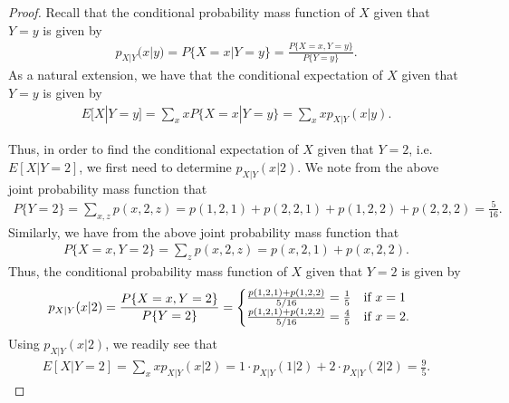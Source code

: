 \begin{proof}
  Recall that the conditional probability mass function of $X$ given that $Y = y$
  is given by
  \begin{align*}
    p_{X|Y}(x|y) = P\{X=x|Y=y\} = \frac{P\{X=x, Y=y\}}{P\{Y=y\}}.
  \end{align*}
  As a natural extension, we have that the conditional expectation of $X$ given
  that $Y=y$ is given by
  \begin{align*}
    E[X|Y=y] = \sum_x x P\{X=x|Y=y\} = \sum_x x p_{X|Y}(x|y).
  \end{align*}

  Thus, in order to find the conditional expectation of $X$ given that $Y=2$, i.e.\ $E[X | Y=2]$,
  we first need to determine $p_{X|Y}(x|2)$. We note from the above joint probability mass function
  that
  \begin{align*}
    P\{Y=2\} = \sum_{x,z}p(x,2,z) = p(1, 2, 1) + p(2, 2, 1) + p(1, 2, 2) + p(2, 2, 2) = \frac{5}{16}.
  \end{align*}
  Similarly, we have from the above joint probability mass function that
  \begin{align*}
    P\{X=x, Y=2\} = \sum_z p(x, 2, z) = p(x, 2, 1) + p(x, 2, 2).
  \end{align*}
  Thus, the conditional probability mass function of $X$ given that $Y=2$ is given by
  \begin{align*}
    p_{X|Y}(x|2) = \frac{P\{X=x, Y=2\}}{P\{Y=2\}} =
    \begin{cases}
      \frac{p(1,2,1) + p(1,2,2)}{5/16} = \frac{1}{5} \text{\quad if $x=1$}\\
      \frac{p(1,2,1) + p(1,2,2)}{5/16} = \frac{4}{5} \text{\quad if $x=2$}.
    \end{cases}
  \end{align*}
  Using $p_{X|Y}(x|2)$, we readily see that
  \begin{align*}
    E[X|Y=2] = \sum_x x p_{X|Y}(x|2) = 1 \cdot p_{X|Y}(1|2)  + 2 \cdot p_{X|Y}(2|2) = \frac{9}{5}.
  \end{align*}


\end{proof}
